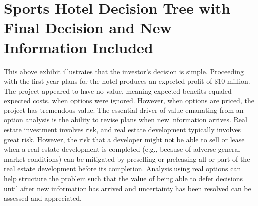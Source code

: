 \documentclass[11pt]{article}
\begin{document}
\section*{Sports Hotel Decision Tree with Final Decision and New Information Included}
This above exhibit illustrates that the investor's decision is simple. Proceeding with the first-year plans for the hotel produces an expected profit of $\$ 10$ million. The project appeared to have no value, meaning expected benefits equaled expected costs, when options were ignored. However, when options are priced, the project has tremendous value. The essential driver of value emanating from an option analysis is the ability to revise plans when new information arrives. Real estate investment involves risk, and real estate development typically involves great risk. However, the risk that a developer might not be able to sell or lease when a real estate development is completed (e.g., because of adverse general market conditions) can be mitigated by preselling or preleasing all or part of the real estate development before its completion. Analysis using real options can help structure the problem such that the value of being able to defer decisions until after new information has arrived and uncertainty has been resolved can be assessed and appreciated.
\end{document}
